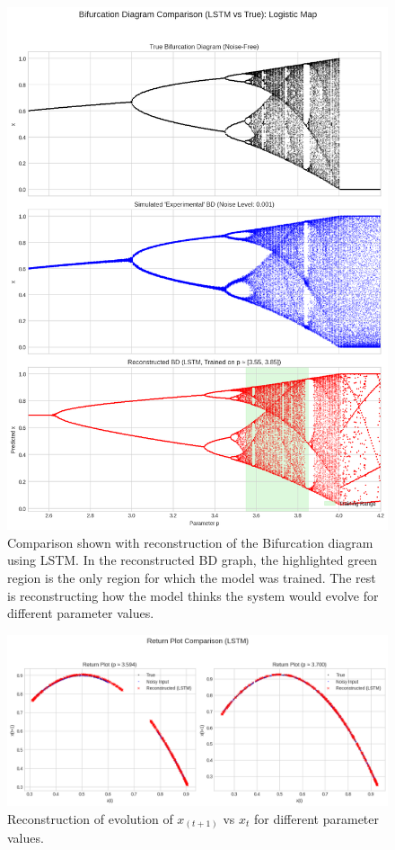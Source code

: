 \documentclass[numbered]{ivt-style/standard}
\begin{document}
\begin{figure}[!htbp]
    \includegraphics[width=1.0\linewidth]{figures/lstm_bd_1.png}
    \caption{Comparison shown with reconstruction of the Bifurcation diagram using LSTM.  In the reconstructed BD graph, the highlighted green region is the only region for which the model was trained. The rest is reconstructing how the model thinks the system would evolve for different parameter values.}
    \label{fig:lstm_bd_1}
\end{figure}\FloatBarrier

%  

\begin{figure}[!htbp]
    \centering
    \includegraphics[width=1\linewidth]{figures/lstm_bd_2.png}
    \caption{Reconstruction of evolution of $x_{(t+1)}$ vs $x_t$ for different parameter values.}
    \label{fig:lstm_bd_2}
\end{figure}
\FloatBarrier
\end{document}
